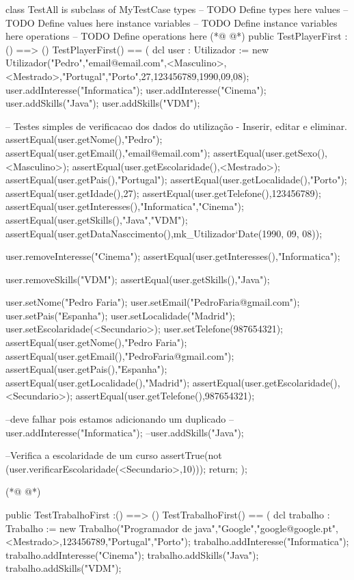 \begin{vdmpp}[breaklines=true]
class TestAll is subclass of MyTestCase
types
-- TODO Define types here
values
-- TODO Define values here
instance variables
-- TODO Define instance variables here
operations
-- TODO Define operations here
(*@
\label{TestPlayerFirst:10}
@*)
public TestPlayerFirst :() ==> ()
TestPlayerFirst() ==
(
 dcl user : Utilizador := new Utilizador("Pedro","email@email.com",<Masculino>,<Mestrado>,"Portugal","Porto",27,123456789,1990,09,08);
 user.addInteresse("Informatica");
 user.addInteresse("Cinema");
 user.addSkills("Java");
 user.addSkills("VDM");
 
 -- Testes simples de verificacao dos dados do utilização - Inserir, editar e eliminar.
 assertEqual(user.getNome(),"Pedro");
 assertEqual(user.getEmail(),"email@email.com");
 assertEqual(user.getSexo(),<Masculino>);
 assertEqual(user.getEscolaridade(),<Mestrado>);
 assertEqual(user.getPais(),"Portugal");
 assertEqual(user.getLocalidade(),"Porto");
 assertEqual(user.getIdade(),27);
 assertEqual(user.getTelefone(),123456789);
 assertEqual(user.getInteresses(),{"Informatica","Cinema"});
 assertEqual(user.getSkills(),{"Java","VDM"});
 assertEqual(user.getDataNasccimento(),mk_Utilizador`Date(1990, 09, 08));
 
 user.removeInteresse("Cinema");
 assertEqual(user.getInteresses(),{"Informatica"});
 
 user.removeSkills("VDM");
 assertEqual(user.getSkills(),{"Java"});
 
 user.setNome("Pedro Faria");
 user.setEmail("PedroFaria@gmail.com");
 user.setPais("Espanha");
 user.setLocalidade("Madrid");
 user.setEscolaridade(<Secundario>);
 user.setTelefone(987654321);
 assertEqual(user.getNome(),"Pedro Faria");
 assertEqual(user.getEmail(),"PedroFaria@gmail.com");
 assertEqual(user.getPais(),"Espanha");
 assertEqual(user.getLocalidade(),"Madrid");
 assertEqual(user.getEscolaridade(),<Secundario>);
 assertEqual(user.getTelefone(),987654321);
 
 --deve falhar pois estamos adicionando um duplicado
 --user.addInteresse("Informatica");
 --user.addSkills("Java");
 
 --Verifica a escolaridade de um curso
 assertTrue(not (user.verificarEscolaridade(<Secundario>,10)));
 return;
);

(*@
\label{TestTrabalhoFirst:60}
@*)

public TestTrabalhoFirst :() ==> ()
TestTrabalhoFirst() ==
(
 dcl trabalho : Trabalho := new Trabalho("Programador de java","Google","google@google.pt",<Mestrado>,123456789,"Portugal","Porto");
 trabalho.addInteresse("Informatica");
 trabalho.addInteresse("Cinema");
 trabalho.addSkills("Java");
 trabalho.addSkills("VDM");
 

\end{vdmpp}
